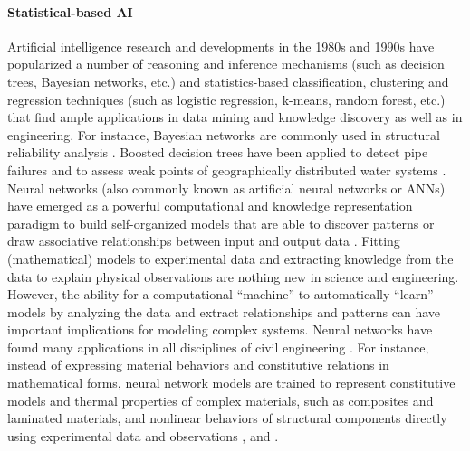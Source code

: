 \paragraph{Statistical-based AI} Artificial intelligence research and developments in the 1980s and 1990s have popularized a number of reasoning and inference mechanisms (such as decision trees, Bayesian networks, etc.) and statistics-based classification, clustering and regression techniques (such as logistic regression, k-means, random forest, etc.) that find ample applications in data mining and knowledge discovery as well as in engineering. For instance, Bayesian networks are commonly used in structural reliability analysis \citep{straub2010bayesian}. Boosted decision trees have been applied to detect pipe failures and to assess weak points of geographically distributed water systems \citep{winkler2018pipe,kumar2018using}. Neural networks (also commonly known as artificial neural networks or ANNs) have emerged as a powerful computational and knowledge representation paradigm to build self-organized models that are able to discover patterns or draw associative relationships between input and output data \citep{bishop1995neural}. Fitting (mathematical) models to experimental data and extracting knowledge from the data to explain physical observations are nothing new in science and engineering. However, the ability for a computational ``machine'' to automatically ``learn'' models by analyzing the data and extract relationships and patterns can have important implications for modeling complex systems. Neural networks have found many applications in all disciplines of civil engineering \citep{garrettjr1996ai,kartam1997artificial}. For instance, instead of expressing material behaviors and constitutive relations in mathematical forms, neural network models are trained to represent constitutive models and thermal properties of complex materials, such as composites and laminated materials, and nonlinear behaviors of structural components directly using experimental data and observations \citep{ghaboussi1991knowledgebased, ghaboussi1998autoprogressive},  and \citep{aquino2006self}. 
 
